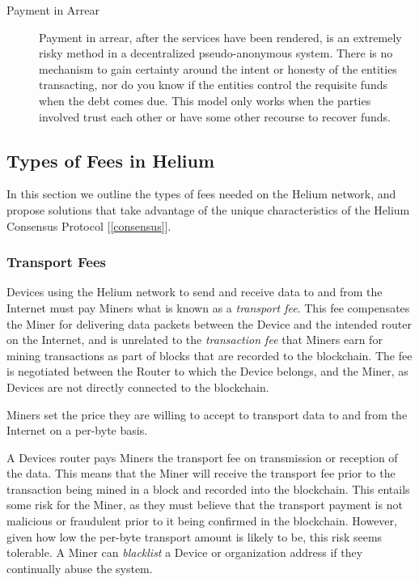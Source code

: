 \documentclass[10pt, nonatbib, nocopyrightspace, reprint]{sigplanconf}
\newcommand{\secref}[1]{[\autoref{#1}]}
\begin{document}
\begin{description}
\item [Payment in Arrear] Payment in arrear, after the services have been rendered, is an extremely risky method in a decentralized pseudo-anonymous system. There is no mechanism to gain certainty around the intent or honesty of the entities transacting, nor do you know if the entities control the requisite funds when the debt comes due. This model only works when the parties involved trust each other or have some other recourse to recover funds.

\end{description}


\subsection{Types of Fees in Helium}

In this section we outline the types of fees needed on the Helium network, and propose solutions that take advantage of the unique characteristics of the Helium Consensus Protocol \secref{consensus}.

\subsubsection{Transport Fees}

Devices using the Helium network to send and receive data to and from the Internet must pay Miners what is known as a \emph{transport fee}. This fee compensates the Miner for delivering data packets between the Device and the intended router on the Internet, and is unrelated to the \emph{transaction fee} that Miners earn for mining transactions as part of blocks that are recorded to the blockchain. The fee is negotiated between the Router to which the Device belongs, and the Miner, as Devices are not directly connected to the blockchain.

Miners set the price they are willing to accept to transport data to and from the Internet on a per-byte basis.

A Devices router pays Miners the transport fee on transmission or reception of the data. This means that the Miner will receive the transport fee prior to the transaction being mined in a block and recorded into the blockchain. This entails some risk for the Miner, as they must believe that the transport payment is not malicious or fraudulent prior to it being confirmed in the blockchain. However, given how low the per-byte transport amount is likely to be, this risk seems tolerable. A Miner can \emph{blacklist} a Device or organization address if they continually abuse the system.
\end{document}
